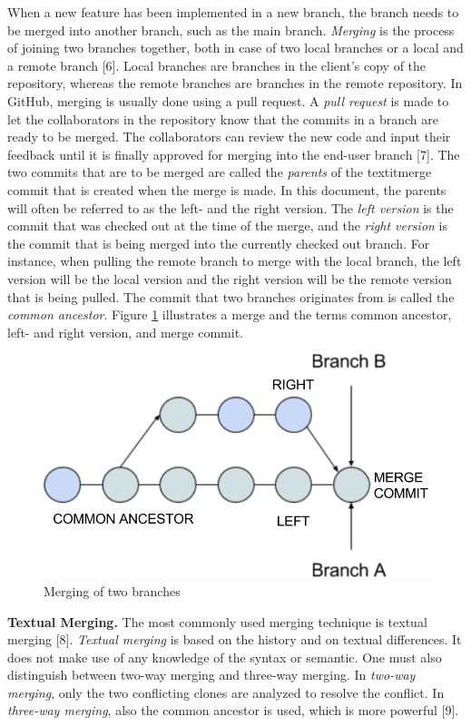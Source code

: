 When a new feature has been implemented in a new branch, the branch needs to be merged into another branch, such as the main branch. \textit{Merging} is the process of joining two branches together, both in case of two local branches or a local and a remote branch [6]. Local branches are branches in the client’s copy of the repository, whereas the remote branches are branches in the remote repository. In GitHub, merging is usually done using a pull request. A \textit{pull request} is made to let the collaborators in the repository know that the commits in a branch are ready to be merged. The collaborators can review the new code and input their feedback until it is finally approved for merging into the end-user branch [7].
\FloatBarrier
The two commits that are to be merged are called the \textit{parents} of the textit{merge commit} that is created when the merge is made. In this document, the parents will often be referred to as the left- and the right version. The \textit{left version} is the commit that was checked out at the time of the merge, and the \textit{right version} is the commit that is being merged into the currently checked out branch. For instance, when pulling the remote branch to merge with the local branch, the left version will be the local version and the right version will be the remote version that is being pulled. The commit that two branches originates from is called the \textit{common ancestor}. Figure \ref{fig:merging} illustrates a merge and the terms common ancestor, left- and right version, and merge commit.

\begin{figure}[H]
\centering
\includegraphics[width=400pt]{figure/merge.png}
\caption{Merging of two branches}\label{fig:merging}
\end{figure}
\FloatBarrier
\textbf{Textual Merging.} The most commonly used merging technique is textual merging [8]. \textit{Textual merging} is based on the history and on textual differences. It does not make use of any knowledge of the syntax or semantic. One must also distinguish between two-way merging and three-way merging. In \textit{two-way merging}, only the two conflicting clones are analyzed to resolve the conflict. In \textit{three-way merging}, also the common ancestor is used, which is more powerful [9].


